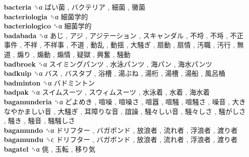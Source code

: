 \textbf{bacteria} ␝α   ばい菌 ,  バクテリア ,  細菌 ,  黴菌   \\
\textbf{bacteriologia} ␝α   細菌学的   \\
\textbf{bacteriologico} ␝α   細菌学的   \\
\textbf{badabada} ␝α   あじ ,  アジ ,  アジテーション ,  スキャンダル ,  不埒 ,  不埓 ,  不正事件 ,  不祥 ,  不祥事 ,  不道 ,  動乱 ,  動揺 ,  大騒ぎ ,  扇動 ,  扇情 ,  汚職 ,  汚行 ,  無道 ,  煽り ,  煽動 ,  煽情 ,  疑獄 ,  興奮 ,  騒動   \\
\textbf{badbroek} ␝α   スイミングパンツ ,  水泳パンツ ,  海パン ,  海水パンツ   \\
\textbf{badkuip} ␝α   バス ,  バスタブ ,  浴槽 ,  湯ぶね ,  湯桁 ,  湯槽 ,  湯船 ,  風呂桶   \\
\textbf{badminton} ␝α   バドミントン   \\
\textbf{badpak} ␝α   スイムスーツ ,  スウィムスーツ ,  水泳着 ,  水着 ,  海水着   \\
\textbf{bagamunderia} ␝α   どよめき ,  喧噪 ,  喧噪さ ,  喧囂 ,  喧騒 ,  喧騒さ ,  噪音 ,  大きなやかましい音 ,  大騒ぎ ,  耳障りな音 ,  誼譟 ,  騒々しい音 ,  騒々しさ ,  騒がしさ ,  騒き ,  騒音 ,  騒騒しさ   \\
\textbf{bagamundo} ␝α   ドリフター ,  バガボンド ,  放浪者 ,  流れ者 ,  浮浪者 ,  渡り者   \\
\textbf{bagamundu} ␝ϲ   ドリフター ,  バガボンド ,  放浪者 ,  流れ者 ,  浮浪者 ,  渡り者   \\
\textbf{bagatel} ␝α   佻 ,  玉転 ,  移り気   \\
